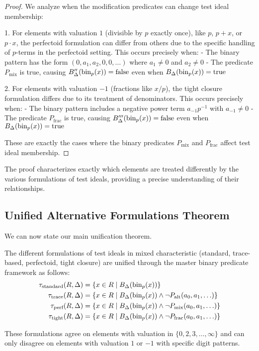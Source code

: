 \begin{proof}
We analyze when the modification predicates can change test ideal membership:

1. For elements with valuation $1$ (divisible by $p$ exactly once), like $p$, $p+x$, or $p \cdot x$, the perfectoid formulation can differ from others due to the specific handling of $p$-terms in the perfectoid setting. This occurs precisely when:
   - The binary pattern has the form $(0, a_1, a_2, 0, 0, \ldots)$ where $a_1 \neq 0$ and $a_2 \neq 0$
   - The predicate $P_{\text{mix}}$ is true, causing $B''_\Delta(\operatorname{bin}_p(x)) = \text{false}$ even when $B_\Delta(\operatorname{bin}_p(x)) = \text{true}$

2. For elements with valuation $-1$ (fractions like $x/p$), the tight closure formulation differs due to its treatment of denominators. This occurs precisely when:
   - The binary pattern includes a negative power term $a_{-1}p^{-1}$ with $a_{-1} \neq 0$
   - The predicate $P_{\text{frac}}$ is true, causing $B'''_\Delta(\operatorname{bin}_p(x)) = \text{false}$ even when $B_\Delta(\operatorname{bin}_p(x)) = \text{true}$

These are exactly the cases where the binary predicates $P_{\text{mix}}$ and $P_{\text{frac}}$ affect test ideal membership.
\end{proof}

The proof characterizes exactly which elements are treated differently by the various formulations of test ideals, providing a precise understanding of their relationships.

\subsection{Unified Alternative Formulations Theorem}

We can now state our main unification theorem.

\begin{theorem}\label{thm:alternative-formulations}
The different formulations of test ideals in mixed characteristic (standard, trace-based, perfectoid, tight closure) are unified through the master binary predicate framework as follows:
\begin{align*}
\tau_{\text{standard}}(R,\Delta) &= \{x \in R \mid B_\Delta(\operatorname{bin}_p(x))\} \\
\tau_{\text{trace}}(R,\Delta) &= \{x \in R \mid B_\Delta(\operatorname{bin}_p(x)) \wedge \neg P_{\text{alt}}(a_0, a_1, \ldots)\} \\
\tau_{\text{perf}}(R,\Delta) &= \{x \in R \mid B_\Delta(\operatorname{bin}_p(x)) \wedge \neg P_{\text{mix}}(a_0, a_1, \ldots)\} \\
\tau_{\text{tight}}(R,\Delta) &= \{x \in R \mid B_\Delta(\operatorname{bin}_p(x)) \wedge \neg P_{\text{frac}}(a_0, a_1, \ldots)\}
\end{align*}

These formulations agree on elements with valuation in $\{0,2,3,\ldots,\infty\}$ and can only disagree on elements with valuation $1$ or $-1$ with specific digit patterns.
\end{theorem}

